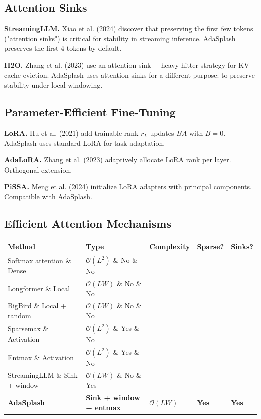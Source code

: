 \subsection{Attention Sinks}

\textbf{StreamingLLM.} Xiao et al. (2024) discover that preserving the first 
few tokens ("attention sinks") is critical for stability in streaming 
inference. AdaSplash preserves the first 4 tokens by default.

\textbf{H2O.} Zhang et al. (2023) use an attention-sink + heavy-hitter strategy 
for KV-cache eviction. AdaSplash uses attention sinks for a different purpose: 
to preserve stability under local windowing.

\subsection{Parameter-Efficient Fine-Tuning}

\textbf{LoRA.} Hu et al. (2021) add trainable rank-$r_L$ updates $B A$ with 
$B = 0$. AdaSplash uses standard LoRA for task adaptation.

\textbf{AdaLoRA.} Zhang et al. (2023) adaptively allocate LoRA rank per layer. 
Orthogonal extension.

\textbf{PiSSA.} Meng et al. (2024) initialize LoRA adapters with principal 
components. Compatible with AdaSplash.

\subsection{Efficient Attention Mechanisms}

\begin{table}[H]
\centering
\small
\begin{tabular}{lllll}
\toprule
\textbf{Method} & \textbf{Type} & \textbf{Complexity} & \textbf{Sparse?} & \textbf{Sinks?} \\
\midrule
Softmax attention \& Dense & $\mathcal{O}(L^2)$ \& No \& No \\
Longformer \& Local & $\mathcal{O}(L W)$ \& No \& No \\
BigBird \& Local + random & $\mathcal{O}(L W)$ \& No \& No \\
Sparsemax \& Activation & $\mathcal{O}(L^2)$ \& Yes \& No \\
Entmax \& Activation & $\mathcal{O}(L^2)$ \& Yes \& No \\
StreamingLLM \& Sink + window & $\mathcal{O}(L W)$ \& No \& Yes \\
\textbf{AdaSplash} & \textbf{Sink + window + entmax} & \textbf{$\mathcal{O}(L W)$} & \textbf{Yes} & \textbf{Yes} \\
\bottomrule
\end{tabular}
\end{table}

